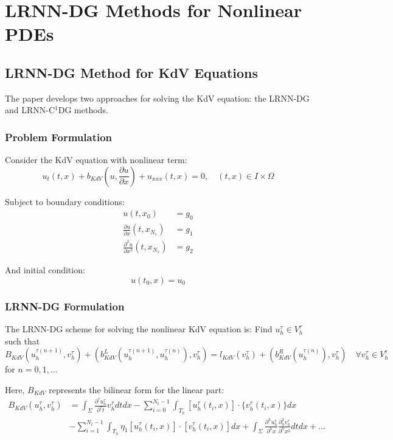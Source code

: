 \documentclass[11pt,a4paper]{article}
\begin{document}
\section{LRNN-DG Methods for Nonlinear PDEs}

\subsection{LRNN-DG Method for KdV Equations}

The paper develops two approaches for solving the KdV equation: the LRNN-DG and LRNN-C$^1$DG methods.

\subsubsection{Problem Formulation}

Consider the KdV equation with nonlinear term:
\begin{equation}
u_t(t, x) + b_{KdV}(u, \frac{\partial u}{\partial x}) + u_{xxx}(t, x) = 0, \quad (t, x) \in I \times \Omega
\end{equation}

Subject to boundary conditions:
\begin{align}
u(t, x_0) &= g_0 \\
\frac{\partial u}{\partial x}(t, x_{N_s}) &= g_1 \\
\frac{\partial^2 u}{\partial x^2}(t, x_{N_s}) &= g_2
\end{align}

And initial condition:
\begin{equation}
u(t_0, x) = u_0
\end{equation}

\subsubsection{LRNN-DG Formulation}

The LRNN-DG scheme for solving the nonlinear KdV equation is: Find $u_h^\tau \in V_h^\tau$ such that
\begin{equation}
B_{KdV}(u_h^{\tau(n+1)}, v_h^\tau) + \left(b_{KdV}^L(u_h^{\tau(n+1)}, u_h^{\tau(n)}), v_h^\tau\right) = l_{KdV}(v_h^\tau) + \left(b_{KdV}^R(u_h^{\tau(n)}), v_h^\tau\right) \quad \forall v_h^\tau \in V_h^\tau
\end{equation}
for $n = 0, 1, \ldots$

Here, $B_{KdV}$ represents the bilinear form for the linear part:
\begin{align}
B_{KdV}(u_h^\tau, v_h^\tau) &= \int_\Sigma \frac{\partial^\tau u_h^\tau}{\partial^\tau t} v_h^\tau dtdx - \sum_{i=0}^{N_t-1} \int_{T_h} [u_h^\tau(t_i, x)] \cdot \{v_h^\tau(t_i, x)\} dx \\
&- \sum_{i=1}^{N_t-1} \int_{T_h} \eta_1 [u_h^\tau(t_i, x)] \cdot [v_h^\tau(t_i, x)] dx + \int_\Sigma \frac{\partial^h u_h^\tau}{\partial^h x} \frac{\partial^2_h v_h^\tau}{\partial^h x^2} dtdx + \ldots
\end{align}
\end{document}
